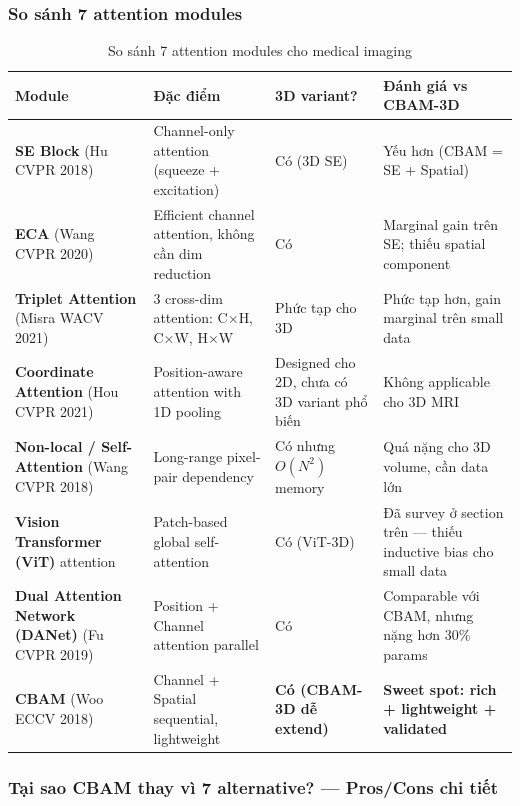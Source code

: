 \documentclass[11pt,a4paper]{article}
\newcommand{\bad}[1]{\textcolor{bad}{#1}}
\newcommand{\best}[1]{\textcolor{best}{\textbf{#1}}}
\begin{document}
\subsubsection*{So sánh 7 attention modules}

\begin{table}[h]
\centering
\caption{So sánh 7 attention modules cho medical imaging}
\small
\begin{tabular}{@{}p{3cm}p{4.5cm}p{2.5cm}p{4.5cm}@{}}
\toprule
\rowcolor{tablehdr}
Module & Đặc điểm & 3D variant? & Đánh giá vs CBAM-3D \\
\midrule
\textbf{SE Block} (Hu CVPR 2018) & Channel-only attention (squeeze + excitation) & Có (3D SE) & \bad{Yếu hơn} (CBAM = SE + Spatial) \\
\textbf{ECA} (Wang CVPR 2020) & Efficient channel attention, không cần dim reduction & Có & Marginal gain trên SE; \bad{thiếu spatial component} \\
\textbf{Triplet Attention} (Misra WACV 2021) & 3 cross-dim attention: C$\times$H, C$\times$W, H$\times$W & Phức tạp cho 3D & Phức tạp hơn, gain marginal trên small data \\
\textbf{Coordinate Attention} (Hou CVPR 2021) & Position-aware attention with 1D pooling & \bad{Designed cho 2D}, chưa có 3D variant phổ biến & Không applicable cho 3D MRI \\
\textbf{Non-local / Self-Attention} (Wang CVPR 2018) & Long-range pixel-pair dependency & Có nhưng \bad{$O(N^2)$ memory} & \bad{Quá nặng} cho 3D volume, cần data lớn \\
\textbf{Vision Transformer (ViT)} attention & Patch-based global self-attention & Có (ViT-3D) & Đã survey ở section trên --- thiếu inductive bias cho small data \\
\textbf{Dual Attention Network (DANet)} (Fu CVPR 2019) & Position + Channel attention parallel & Có & Comparable với CBAM, nhưng nặng hơn 30\% params \\
\midrule
\rowcolor{tablehdr}
\best{CBAM} (Woo ECCV 2018) & Channel + Spatial sequential, lightweight & \best{Có (CBAM-3D dễ extend)} & \best{Sweet spot: rich + lightweight + validated} \\
\bottomrule
\end{tabular}
\end{table}

\subsubsection*{Tại sao CBAM thay vì 7 alternative? — Pros/Cons chi tiết}
\end{document}

